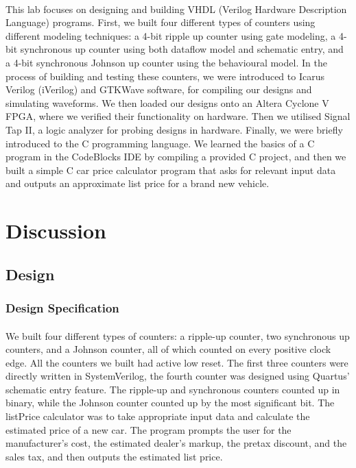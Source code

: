 \documentclass{article}
\begin{document}
\paragraph{} This lab focuses on designing and building VHDL (Verilog Hardware Description Language) programs. First, we built four different types of counters using different modeling techniques: a 4-bit ripple up counter using gate modeling, a 4-bit synchronous up counter using both dataflow model and schematic entry, and a 4-bit synchronous Johnson up counter using the behavioural model. In the process of building and testing these counters, we were introduced to Icarus Verilog (iVerilog) and GTKWave software, for compiling our designs and simulating waveforms. We then loaded our designs onto an Altera Cyclone V FPGA, where we verified their functionality on hardware. Then we utilised Signal Tap II, a logic analyzer for probing designs in hardware. Finally, we were briefly introduced to the C programming language. We learned the basics of a C program in the CodeBlocks IDE by compiling a provided C project, and then we built a simple C car price calculator program that asks for relevant input data and outputs an approximate list price for a brand new vehicle.



\section{Discussion}
  \subsection{Design}
	  \subsubsection{Design Specification}
	  	\paragraph{} We built four different types of counters: a ripple-up counter, two synchronous up counters, and a Johnson counter, all of which counted on every positive clock edge. All the counters we built had active low reset. The first three counters were directly written in SystemVerilog, the fourth counter was designed using Quartus’ schematic entry feature. The ripple-up and synchronous counters counted up in binary, while the Johnson counter counted up by the most significant bit. The listPrice calculator was to take appropriate input data and calculate the estimated price of a new car. The program prompts the user for the manufacturer’s cost, the estimated dealer’s markup, the pretax discount, and the sales tax, and then outputs the estimated list price.
\end{document}
